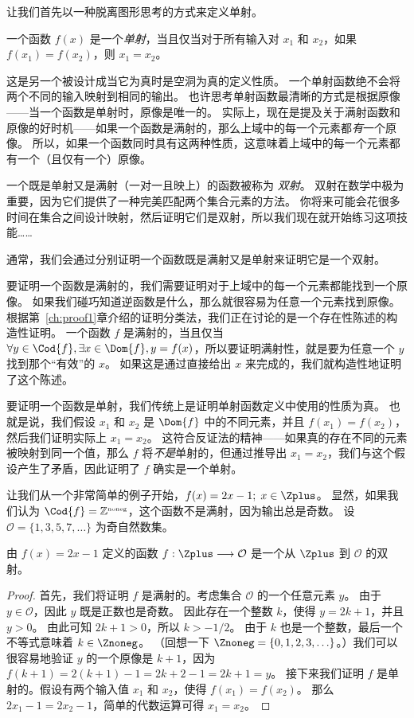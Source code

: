 让我们首先以一种脱离图形思考的方式来定义单射。

\begin{defi}
一个函数 $f(x)$ 是一个\emph{单射}，当且仅当对于所有输入对 $x_1$ 和 $x_2$，如果 $f(x_1) = f(x_2)$，则 $x_1=x_2$。
\end{defi}

这是另一个被设计成当它为真时是空洞为真的定义性质。
一个单射函数绝不会将两个不同的输入映射到相同的输出。
也许思考单射函数最清晰的方式是根据原像——当一个函数是单射时，原像是唯一的。
实际上，现在是提及关于满射函数和原像的好时机——如果一个函数是满射的，那么上域中的每一个元素都\emph{有}一个原像。
所以，如果一个函数同时具有这两种性质，这意味着上域中的每一个元素都有一个（且仅有一个）原像。

一个既是单射又是满射（一对一且映上）的函数被称为 \emph{双射}。
双射在数学中极为重要，因为它们提供了一种完美匹配两个集合元素的方法。
你将来可能会花很多时间在集合之间设计映射，然后证明它们是双射，所以我们现在就开始练习这项技能……

通常，我们会通过分别证明一个函数既是满射又是单射来证明它是一个双射。

要证明一个函数是满射的，我们需要证明对于上域中的每一个元素都能找到一个原像。
如果我们碰巧知道逆函数是什么，那么就很容易为任意一个元素找到原像。
根据第~\ref{ch:proof1}章介绍的证明分类法，我们正在讨论的是一个存在性陈述的构造性证明。
一个函数 $f$ 是满射的，当且仅当 $\forall y \in \Cod{f}, \exists x \in \Dom{f}, y = f(x)$，所以要证明满射性，就是要为任意一个 $y$ 找到那个“有效”的 $x$。
如果这是通过直接给出 $x$ 来完成的，我们就构造性地证明了这个陈述。

要证明一个函数是单射，我们传统上是证明单射函数定义中使用的性质为真。
也就是说，我们假设 $x_1$ 和 $x_2$ 是 $\Dom{f}$ 中的不同元素，并且 $f(x_1)=f(x_2)$，然后我们证明实际上 $x_1 = x_2$。
这符合反证法的精神——如果真的存在不同的元素被映射到同一个值，那么 $f$ 将\emph{不是}单射的，但通过推导出 $x_1=x_2$，我们与这个假设产生了矛盾，因此证明了 $f$ 确实是一个单射。

让我们从一个非常简单的例子开始，$f(x)=2x-1; \; x \in \Zplus$。
显然，如果我们认为 $\Cod{f}=\Naturals$，这个函数不是满射，因为输出总是奇数。
设 ${\mathcal O} = \{1, 3, 5, 7, \ldots \}$ 为奇自然数集。

\begin{thm}
由 $f(x) = 2x-1$ 定义的函数 $f:\Zplus \longrightarrow {\mathcal O}$ 是一个从 $\Zplus$ 到 ${\mathcal O}$ 的双射。
\end{thm}

\begin{proof}
首先，我们将证明 $f$ 是满射的。考虑集合 $\mathcal O$ 的一个任意元素 $y$。
由于 $y \in {\mathcal O}$，因此 $y$ 既是正数也是奇数。
因此存在一个整数 $k$，使得 $y=2k+1$，并且 $y>0$。
由此可知 $2k+1 > 0$，所以 $k > -1/2$。
由于 $k$ 也是一个整数，最后一个不等式意味着 $k \in \Znoneg$。
（回想一下 $\Znoneg = \{0,1,2,3, \ldots \}$。）我们可以很容易地验证 $y$ 的一个原像是 $k+1$，因为 $f(k+1) = 2(k+1)-1 = 2k+2-1 = 2k+1 = y$。
接下来我们证明 $f$ 是单射的。假设有两个输入值 $x_1$ 和 $x_2$，使得 $f(x_1) = f(x_2)$。
那么 $2x_1-1 = 2x_2-1$，简单的代数运算可得 $x_1=x_2$。
\end{proof}
 
